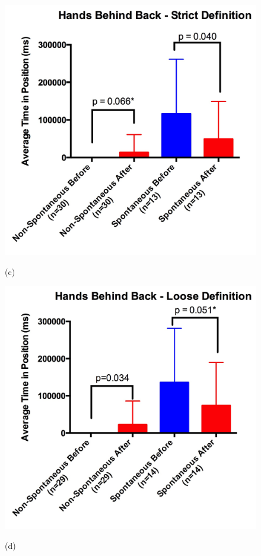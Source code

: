 \documentclass{acm_proc_article-sp}
\begin{document}
\begin{figure}[t!]
\centering
 \includegraphics[width=0.65\linewidth]{images/bstrict.jpg}\\
 \caption{(c)}
 \label{bstrict} %
\end{figure}

\begin{figure}[t!]
\centering
 \includegraphics[width=0.65\linewidth]{images/bloose.jpg}\\
 \caption{(d)}
 \label{bloose} %
\end{figure}
\end{document}
